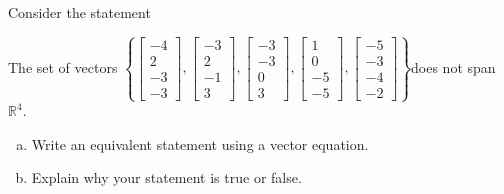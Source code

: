 
\begin{exerciseStatement}


Consider the statement 
\begin{center}\begin{minipage}{0.8\textwidth}
 The set of vectors \( \left\{ \left[\begin{array}{c}
-4 \\
2 \\
-3 \\
-3
\end{array}\right] , \left[\begin{array}{c}
-3 \\
2 \\
-1 \\
3
\end{array}\right] , \left[\begin{array}{c}
-3 \\
-3 \\
0 \\
3
\end{array}\right] , \left[\begin{array}{c}
1 \\
0 \\
-5 \\
-5
\end{array}\right] , \left[\begin{array}{c}
-5 \\
-3 \\
-4 \\
-2
\end{array}\right] \right\} \)does not span \(\mathbb{R}^4\). 
\end{minipage}\end{center}
    


\begin{enumerate}[(a)]
\item  Write an equivalent statement using a vector equation.
\item  Explain why your statement is true or false.
\end{enumerate}
    
\end{exerciseStatement}
    
